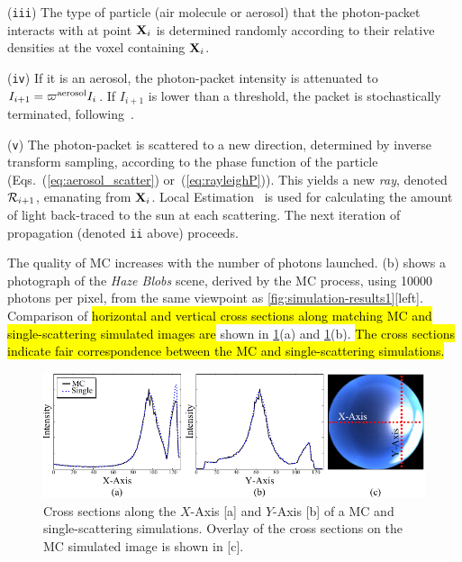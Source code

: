 \documentclass[10pt,letterpaper]{article}
\newcommand{\yoavcomment}[1]{}
\renewcommand{\yoavcomment}[1]{#1} %
\begin{document}
\noindent ({\tt iii}) The type of particle (air molecule or aerosol)
that the photon-packet interacts with at point ${\bf X}_{i}$ is determined
randomly according to their relative densities at the voxel containing
${\bf X}_{i}$.

\noindent ({\tt iv}) If it is an aerosol, the photon-packet intensity
is attenuated to $I_{i+1}=\varpi^{\rm aerosol}I_{i}$. If $I_{i+1}$ is
lower than a threshold, the packet is stochastically terminated,
following~\cite{Iwabuchi2006}.

\noindent ({\tt v}) The photon-packet is scattered to a new direction,
determined by inverse transform sampling, according to the phase
function of the particle (Eqs.~(\ref{eq:aerosol_scatter})
or~(\ref{eq:rayleighP})). This yields a new {\em ray}, denoted ${\cal
  R}_{i+1}$, emanating from ${\bf X}_{i}$. Local
Estimation~\cite{marshak20053d} is used for calculating the amount of
light back-traced to the sun at each scattering. The next iteration of
propagation (denoted {\tt ii} above) proceeds.

The quality of MC increases with the number of photons launched.
(b) shows a photograph of the {\em Haze Blobs}
scene, derived by the MC process, using \num{10000} photons per pixel,
from the same viewpoint as \cref{fig:simulation-results1}[left].
Comparison of \hl{horizontal and vertical cross sections along 
matching MC and single-scattering simulated images are} shown in
\cref{fig:cross_sections}(a) and \cref{fig:cross_sections}(b).
\hl{The cross sections indicate fair correspondence between
the MC and single-scattering simulations.}
\begin{figure}[th]
  \centering
  \yoavcomment{\includegraphics{images/cross_sections.pdf}}
  \caption{\small Cross sections along the $X$-Axis [a] and $Y$-Axis [b] of
    a MC and single-scattering simulations. Overlay of the cross
    sections on the MC simulated image is shown in [c]. }
  \label{fig:cross_sections}
\end{figure}
\end{document}
